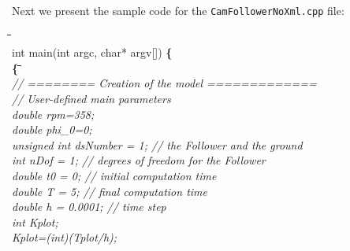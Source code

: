 Next we present the sample code for the
\verb"CamFollowerNoXml.cpp" file:
\begin{tabbing}
\hspace{1cm}\= \hspace{0.5cm}\= \hspace{1cm}\= \hspace{1cm}\= \hspace{1cm}\\
 \> \+ int main(int argc, char* argv[]) {\bf \{} \\
 \>  {\bf\{} \+ \hspace{0.5cm}\= \hspace{2cm}\= \hspace{1cm}\=\hspace{1cm}\=\hspace{1cm}\=\hspace{1cm}\=\\
 \> \em   // ======== Creation of the model =============\\
 \> \em  // User-defined main parameters\\

 \> double rpm=358; \\
 \> double phi\_0=0;\\

 \> unsigned int dsNumber = 1; \>\>\>\> \em // the Follower and the ground\\
 \> int nDof = 1;  \>\>\>\>    \em // degrees of freedom for the Follower\\
 \> double t0 = 0;            \>\>\>\>  \em   // initial computation time\\
 \> double T = 5;             \>\>\>\>  \em    // final computation time\\
 \> double h = 0.0001;   \>\>\>\>       \em // time step\\
 \> int Kplot;\\
 \> Kplot=(int)(Tplot/h);\\


\end{tabbing}
